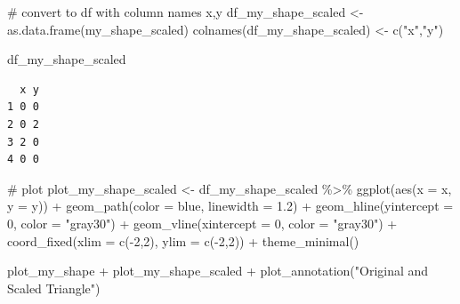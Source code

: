 \documentclass[
  letterpaper,
  DIV=11,
  numbers=noendperiod]{scrartcl}
\newenvironment{Shaded}{\begin{snugshade}}{\end{snugshade}}
\newcommand{\AttributeTok}[1]{\textcolor[rgb]{0.40,0.45,0.13}{#1}}
\newcommand{\CommentTok}[1]{\textcolor[rgb]{0.37,0.37,0.37}{#1}}
\newcommand{\DecValTok}[1]{\textcolor[rgb]{0.68,0.00,0.00}{#1}}
\newcommand{\FloatTok}[1]{\textcolor[rgb]{0.68,0.00,0.00}{#1}}
\newcommand{\FunctionTok}[1]{\textcolor[rgb]{0.28,0.35,0.67}{#1}}
\newcommand{\NormalTok}[1]{\textcolor[rgb]{0.00,0.23,0.31}{#1}}
\newcommand{\OtherTok}[1]{\textcolor[rgb]{0.00,0.23,0.31}{#1}}
\newcommand{\SpecialCharTok}[1]{\textcolor[rgb]{0.37,0.37,0.37}{#1}}
\newcommand{\StringTok}[1]{\textcolor[rgb]{0.13,0.47,0.30}{#1}}
\begin{document}
\begin{Shaded}
\begin{Highlighting}[]
\CommentTok{\# convert to df with column names x,y}
\NormalTok{df\_my\_shape\_scaled }\OtherTok{\textless{}{-}} \FunctionTok{as.data.frame}\NormalTok{(my\_shape\_scaled)  }
\FunctionTok{colnames}\NormalTok{(df\_my\_shape\_scaled) }\OtherTok{\textless{}{-}} \FunctionTok{c}\NormalTok{(}\StringTok{"x"}\NormalTok{,}\StringTok{"y"}\NormalTok{)}

\NormalTok{df\_my\_shape\_scaled}
\end{Highlighting}
\end{Shaded}

\begin{verbatim}
  x y
1 0 0
2 0 2
3 2 0
4 0 0
\end{verbatim}

\begin{Shaded}
\begin{Highlighting}[]
\CommentTok{\# plot}
\NormalTok{plot\_my\_shape\_scaled }\OtherTok{\textless{}{-}}\NormalTok{ df\_my\_shape\_scaled }\SpecialCharTok{\%\textgreater{}\%} 
  \FunctionTok{ggplot}\NormalTok{(}\FunctionTok{aes}\NormalTok{(}\AttributeTok{x =}\NormalTok{ x, }\AttributeTok{y =}\NormalTok{ y)) }\SpecialCharTok{+}
  \FunctionTok{geom\_path}\NormalTok{(}\AttributeTok{color =} \StringTok{\textquotesingle{}blue\textquotesingle{}}\NormalTok{, }\AttributeTok{linewidth =} \FloatTok{1.2}\NormalTok{) }\SpecialCharTok{+}
  \FunctionTok{geom\_hline}\NormalTok{(}\AttributeTok{yintercept =} \DecValTok{0}\NormalTok{, }\AttributeTok{color =} \StringTok{"gray30"}\NormalTok{) }\SpecialCharTok{+}
  \FunctionTok{geom\_vline}\NormalTok{(}\AttributeTok{xintercept =} \DecValTok{0}\NormalTok{, }\AttributeTok{color =} \StringTok{"gray30"}\NormalTok{) }\SpecialCharTok{+}
  \FunctionTok{coord\_fixed}\NormalTok{(}\AttributeTok{xlim =} \FunctionTok{c}\NormalTok{(}\SpecialCharTok{{-}}\DecValTok{2}\NormalTok{,}\DecValTok{2}\NormalTok{), }\AttributeTok{ylim =} \FunctionTok{c}\NormalTok{(}\SpecialCharTok{{-}}\DecValTok{2}\NormalTok{,}\DecValTok{2}\NormalTok{)) }\SpecialCharTok{+}
  \FunctionTok{theme\_minimal}\NormalTok{()}

\NormalTok{plot\_my\_shape }\SpecialCharTok{+}\NormalTok{ plot\_my\_shape\_scaled  }\SpecialCharTok{+} \FunctionTok{plot\_annotation}\NormalTok{(}\StringTok{"Original and Scaled Triangle"}\NormalTok{)}
\end{Highlighting}
\end{Shaded}
\end{document}
